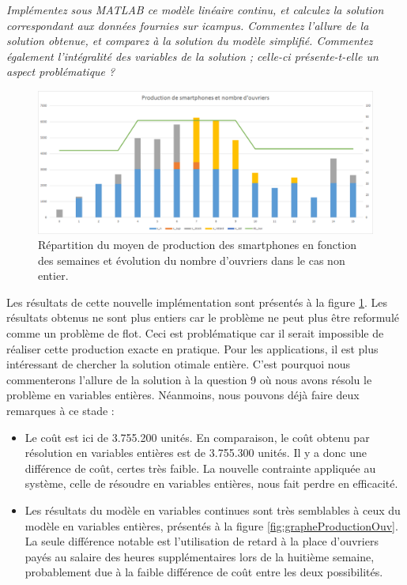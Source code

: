 \question %
\emph{Implémentez sous MATLAB ce modèle linéaire continu,
et calculez la solution correspondant aux données fournies sur icampus.
Commentez l'allure de la solution obtenue, et comparez à la solution du modèle
simplifié. Commentez également l'intégralité des variables de la solution ;
celle-ci présente-t-elle un aspect problématique ?}

\begin{figure}[H]
  \begin{center}
    \includegraphics[scale = 0.75]{img/grapheProductionOuvNonInt.png}
	  \caption{Répartition du moyen de production des smartphones en fonction des semaines et évolution du nombre d'ouvriers dans le cas non entier.}
	  \label{fig:grapheProductionOuvNonInt}
  \end{center}
\end{figure}

Les résultats de cette nouvelle implémentation sont présentés à la figure \ref{fig:grapheProductionOuvNonInt}. Les résultats obtenus ne sont plus entiers car le problème ne peut plus être reformulé comme un problème de flot. Ceci est problématique car il serait impossible de réaliser cette production exacte en pratique. Pour les applications, il est plus intéressant de chercher la solution otimale entière. C'est pourquoi nous commenterons l'allure de la solution à la question 9 où nous avons résolu le problème en variables entières. Néanmoins, nous pouvons déjà faire deux remarques à ce stade :
\begin{itemize}
\item Le coût est ici de 3.755.200 unités. En comparaison, le coût obtenu par résolution en variables entières est de 3.755.300 unités. Il y a donc une différence de coût, certes très faible. La nouvelle contrainte appliquée au système, celle de résoudre en variables entières, nous fait perdre en efficacité. 
\item Les résultats du modèle en variables continues sont très semblables à ceux du modèle en variables entières, présentés à la figure \ref{fig:grapheProductionOuv}. La seule différence notable est l'utilisation de retard à la place d'ouvriers payés au salaire des heures supplémentaires lors de la huitième semaine, probablement due à la faible différence de coût entre les deux possibilités.
\end{itemize}